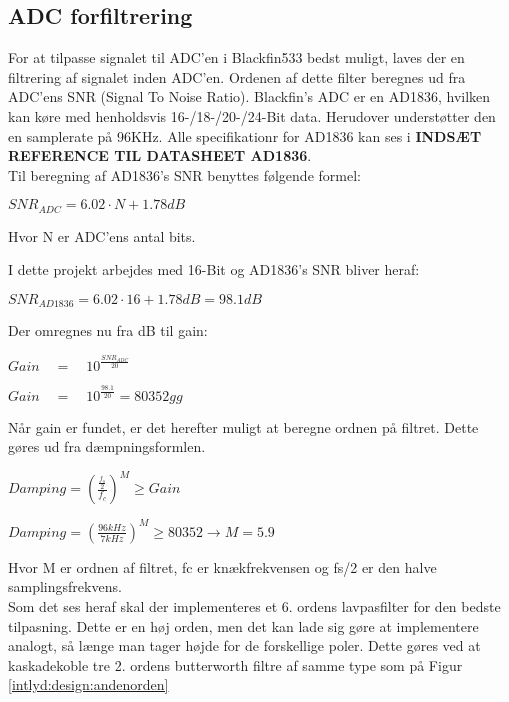 
\subsection{ADC forfiltrering}

For at tilpasse signalet til ADC'en i Blackfin533 bedst muligt, laves der en filtrering af signalet inden ADC'en. 
Ordenen af dette filter beregnes ud fra ADC'ens SNR (Signal To Noise Ratio). Blackfin's ADC er en AD1836, hvilken kan køre med henholdsvis 16-/18-/20-/24-Bit data. Herudover understøtter den en samplerate på 96KHz. Alle specifikationr for AD1836 kan ses i \textbf{INDSÆT REFERENCE TIL DATASHEET AD1836}. \\

Til beregning af AD1836's SNR benyttes følgende formel:
\begin{center}
${ SNR }_{ ADC }=6.02\cdot N+1.78dB$
\end{center}

Hvor N er ADC'ens antal bits. 

I dette projekt arbejdes med 16-Bit og AD1836's SNR bliver heraf: 
\begin{center}
${ SNR }_{ AD1836 }=6.02\cdot 16+1.78dB = 98.1dB$
\end{center}

Der omregnes nu fra dB til gain: 
\begin{center}
$Gain\quad =\quad { 10 }^{ \frac { { SNR }_{ ADC } }{ 20 }  }$

$Gain\quad =\quad { 10 }^{ \frac { 98.1 }{ 20 }  }=80352gg$
\end{center}

Når gain er fundet, er det herefter muligt at beregne ordnen på filtret. Dette gøres ud fra dæmpningsformlen. 
\begin{center}
$Damping={ \left( \frac { \frac { { f }_{ s } }{ 2 }  }{ { f }_{ c } }  \right)  }^{ M }\ge Gain$

$Damping={ \left( \frac { 96kHz }{ 7kHz }  \right)  }^{ M }\ge 80352\rightarrow M=5.9$
\end{center}

Hvor M er ordnen af filtret, fc er knækfrekvensen og fs/2 er den halve samplingsfrekvens.\\

Som det ses heraf skal der implementeres et 6. ordens lavpasfilter for den bedste tilpasning. Dette er en høj orden, men det kan lade sig gøre at implementere analogt, så længe man tager højde for de forskellige poler. 
Dette gøres ved at kaskadekoble tre 2. ordens butterworth filtre af samme type som på Figur \ref{intlyd:design:andenorden}

